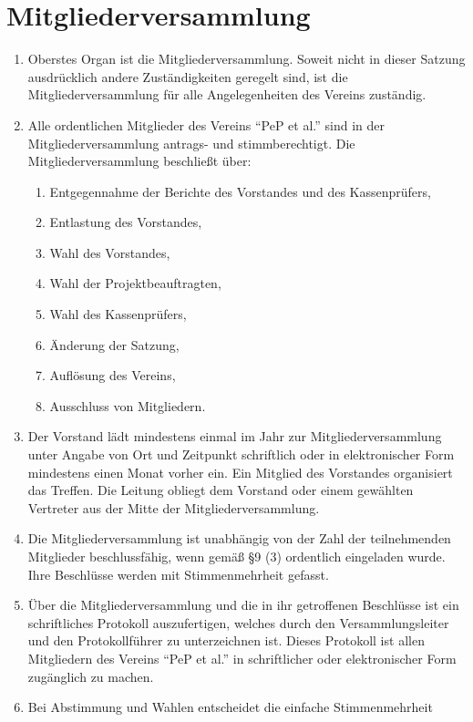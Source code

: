\documentclass[
  fontsize=12pt,
  paper=a4,
  DIV14,
  parskip,
]{scrartcl}
\begin{document}
\section{Mitgliederversammlung}

\begin{enumerate}
	\item Oberstes Organ ist die Mitgliederversammlung. Soweit nicht in dieser
		Satzung ausdrücklich andere Zuständigkeiten geregelt sind, ist die
		Mitgliederversammlung für alle Angelegenheiten des Vereins zuständig.
	\item Alle ordentlichen Mitglieder des Vereins \enquote{PeP et al.} sind
		in der Mitgliederversammlung antrags- und stimmberechtigt. Die
		Mitgliederversammlung beschließt über:
	\begin{enumerate}
		\item Entgegennahme der Berichte des Vorstandes und des Kassenprüfers,
		\item Entlastung des Vorstandes,
		\item Wahl des Vorstandes,
		\item Wahl der Projektbeauftragten,
		\item Wahl des Kassenprüfers,
		\item Änderung der Satzung,
		\item Auflösung des Vereins,
		\item Ausschluss von Mitgliedern.
	\end{enumerate}
	\item Der Vorstand lädt mindestens einmal im Jahr zur Mitgliederversammlung
		unter Angabe von Ort und Zeitpunkt schriftlich oder in elektronischer Form
		mindestens einen Monat vorher ein. Ein Mitglied des Vorstandes organisiert
		das Treffen. Die Leitung obliegt dem Vorstand oder einem gewählten
		Vertreter aus der Mitte der Mitgliederversammlung.
	\item Die Mitgliederversammlung ist unabhängig von der Zahl der teilnehmenden
		Mitglieder beschlussfähig, wenn gemäß §9 (3) ordentlich eingeladen wurde.
		Ihre Beschlüsse werden mit Stimmenmehrheit gefasst.
	\item Über die Mitgliederversammlung und die in ihr getroffenen Beschlüsse
		ist ein schriftliches Protokoll auszufertigen, welches durch den
		Versammlungsleiter und den Protokollführer zu unterzeichnen ist. Dieses
		Protokoll ist allen Mitgliedern des Vereins \enquote{PeP et al.} in
		schriftlicher oder elektronischer Form zugänglich zu machen.
	\item Bei Abstimmung und Wahlen entscheidet die einfache Stimmenmehrheit

\end{enumerate}
\end{document}
